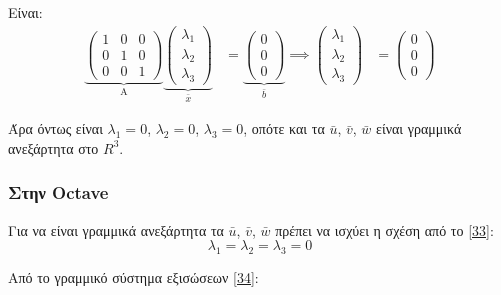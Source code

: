 \documentclass[12pt, fleqn, leqno]{extreport}
\begin{document}
Είναι:
\begin{equation*}
    \begin{aligned}
        \underbrace{
            \begin{pmatrix}
                1 & 0 & 0 \\
                0 & 1 & 0 \\
                0 & 0 & 1
            \end{pmatrix}}_\text{A}
        \underbrace{
        \begin{pmatrix}
                \lambda_{1} \\
                \lambda_{2} \\
                \lambda_{3}
            \end{pmatrix}}_\text{$\bar{x}$} & =
        \underbrace{
            \begin{pmatrix}
                0 \\
                0 \\
                0
            \end{pmatrix}}_\text{$\bar{b}$}
        \implies
        \begin{pmatrix}
            \lambda_{1} \\
            \lambda_{2} \\
            \lambda_{3}
        \end{pmatrix}                   & =
        \begin{pmatrix}
            0 \\
            0 \\
            0
        \end{pmatrix}
    \end{aligned}
\end{equation*}

Άρα όντως είναι $\lambda_{1}=0$, $\lambda_{2}=0$, $\lambda_{3}=0$, οπότε και τα $\bar{u}$, $\bar{v}$, $\bar{w}$ είναι γραμμικά ανεξάρτητα στο $R^{3}$.

\subsubsection{Στην Octave}

Για να είναι γραμμικά ανεξάρτητα τα $\bar{u}$, $\bar{v}$, $\bar{w}$ πρέπει να ισχύει η σχέση από το \eqref{33}:
\begin{equation*}
    \lambda_{1} = \lambda_{2} = \lambda_{3} = 0
\end{equation*}

Από το γραμμικό σύστημα εξισώσεων \eqref{34}:
\end{document}
